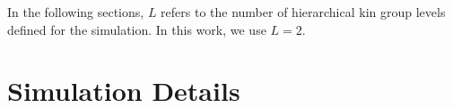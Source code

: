 

\dissertationexclude{\clearpage}
\dissertationexclude{\onecolumn}



\dissertationexclude{\clearpage}



\dissertationexclude{\clearpage}



\dissertationexclude{\clearpage}
\dissertationexclude{\twocolumn}






% 


In the following sections, $L$ refers to the number of hierarchical kin group levels defined for the simulation.
In this work, we use $L=2$.










\section{Simulation Details}
\label{sec:simulation-details}

